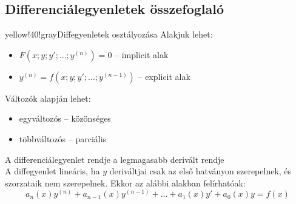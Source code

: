 \documentclass[main.tex]{subfiles}
\begin{document}
\subsection{Differenciálegyenletek összefoglaló}



\begin{cbox}{yellow!40!gray}{Diffegyenletek osztályozása}
  Alakjuk lehet:
  \begin{itemize}
    \item $F(x;y;y';\dots;y^{(n)}) = 0$
          \tabto{5.35cm} – \tabto{6cm} implicit alak

    \item $y^{(n)} = f(x;y;y';\dots;y^{(n-1)})$
          \tabto{5.35cm} – \tabto{6cm} explicit alak
  \end{itemize}

  Változók alapján lehet:
  \begin{itemize}
    \item egyváltozós
          \tabto{2.6cm} – \tabto{3.2cm} közönséges

    \item többváltozós
          \tabto{2.6cm} – \tabto{3.2cm} parciális
  \end{itemize}

  A differenciálegyenlet rendje a legmagasabb derivált rendje
  \\[2mm]
  A diffegyenlet lineáris, ha $y$ deriváltjai csak az első
  hatványon szerepelnek, és szorzataik nem szerepelnek.
  Ekkor az alábbi alakban felírhatóak:
  \[
    a_n(x) y^{(n)}
    + a_{n-1}(x) y^{(n-1)}
    + \dots
    + a_1(x) y'
    + a_0(x) y
    = f(x)
  \]
\end{cbox}
\end{document}
